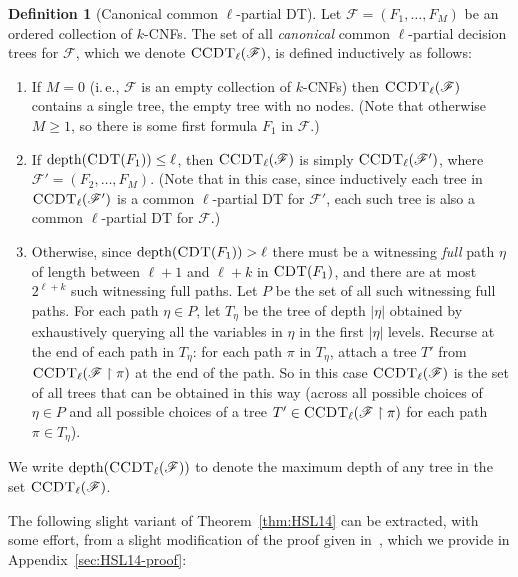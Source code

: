 \documentclass[11pt]{article}
\numberwithin{equation}{section}
\theoremstyle{definition}
\newtheorem{definition}[theorem]{Definition}
\theoremstyle{plain}
\newcommand{\ie}{i.\,e.}
\theoremstyle{plain}
\newcommand{\uhr}{\upharpoonright}
\newcommand{\CDT}{\textsc{CDT}}
\newcommand{\CCDT}{\textsc{CCDT}}
\newcommand{\depth}{\mathrm{depth}}
\begin{document}
\begin{definition}[Canonical common $\ell$-partial DT]
\label{def:ccpdt}
Let $\mathscr{F} = (F_1,\ldots,F_M)$ be an ordered collection of $k$-CNFs.  The set of all \emph{canonical} common $\ell$-partial decision trees for $\mathscr{F}$, which we denote $\CCDT_\ell(\mathscr{F})$, is defined inductively as follows: 
\begin{enumerate}

\item [0.] If $M=0$ (\ie, $\mathscr{F}$ is an empty collection of $k$-CNFs) then $\CCDT_\ell(\mathscr{F})$ contains a single tree, the empty tree with no nodes.  (Note that otherwise $M\geq 1$, so there is some first formula $F_1$ in $\mathscr{F}.$)

\item If $\depth(\CDT(F_1)) \le \ell$, then $\CCDT_\ell(\mathscr{F})$ is simply $\CCDT_\ell(\mathscr{F}')$, where $\mathscr{F}' = (F_2,\dots,F_M)$. (Note that in this case, since inductively each tree in $\CCDT_\ell(\mathscr{F}')$ is a common $\ell$-partial DT for $\mathscr{F}'$, each such tree is also a common $\ell$-partial DT for $\mathscr{F}$.)

\item Otherwise, since $\depth(\CDT(F_1)) > \ell$ there must be a witnessing {\emph{full}} path {$\eta$} of length {between $\ell+1$ and $\ell + k$} in $\CDT(F_1)$, and there are at most {$2^{\ell + k}$} such witnessing full paths. Let $P$ be the set of all such witnessing full paths.  For each path ${\eta} \in P$,  let $T_{\eta}$ be the tree of depth {$|\eta|$} obtained by exhaustively querying all the variables in {$\eta$} in the first {$|\eta|$} levels.  Recurse at the end of each path in $T_{{\eta}}$: for each path $\pi$ in $T_{{\eta}}$, attach a tree $T'$ from $\CCDT_\ell(\mathscr{F}\uhr \pi)$ at the end of the path.  So in this case $\CCDT_\ell(\mathscr{F})$ is the set of all trees that can be obtained in this way (across all possible choices of ${\eta} \in P$ and all possible choices of a tree $T' \in \CCDT_\ell(\mathscr{F}\uhr \pi)$ for each path $\pi \in T_{{\eta}}$).

\end{enumerate} 
We write $\depth(\CCDT_\ell(\mathscr{F}))$ to denote the maximum depth of any tree in the set 
$\CCDT_\ell(\mathscr{F})$.
\end{definition} 




The following slight variant of Theorem~\ref{thm:HSL14} can be extracted, with some effort, from a slight modification of the proof given in~\cite{Has14}, which we provide in Appendix~\ref{sec:HSL14-proof}: 
\end{document}
